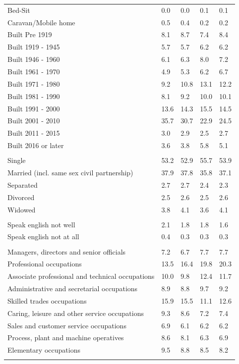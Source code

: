\documentclass{article}
\begin{document}
\begin{table}[h]
\begin{tabular}{KTTTT}
Bed-Sit & 0.0& 0.0& 0.1& 0.1\\
Caravan/Mobile home & 0.5& 0.4& 0.2& 0.2\\
    \hline
Built Pre 1919 & 8.1& 8.7& 7.4& 8.4\\
Built 1919 - 1945 & 5.7& 5.7& 6.2& 6.2\\
Built  1946 - 1960 & 6.1& 6.3& 8.0& 7.2\\
Built  1961 - 1970 & 4.9& 5.3& 6.2& 6.7\\
Built  1971 - 1980 &  9.2& 10.8& 13.1& 12.2\\
Built  1981 - 1990 &  8.1&  9.2& 10.0& 10.1\\
Built  1991 - 2000 & 13.6& 14.3& 15.5& 14.5\\
Built  2001 - 2010 & 35.7& 30.7& 22.9& 24.5\\
Built  2011 - 2015 & 3.0& 2.9& 2.5& 2.7\\
Built  2016 or later & 3.6& 3.8& 5.8& 5.1\\
\hline
    \\
    \hline
Single & 53.2& 52.9& 55.7& 53.9\\
Married (incl. same sex civil partnership) & 37.9& 37.8& 35.8& 37.1\\
Separated  & 2.7& 2.7& 2.4& 2.3\\
Divorced  & 2.5& 2.6& 2.5& 2.6\\
Widowed & 3.8& 4.1& 3.6& 4.1\\
\hline
    \\ 
    \hline
Speak english not well & 2.1& 1.8& 1.8& 1.6\\
Speak english not at all & 0.4& 0.3& 0.3& 0.3\\
\hline
    \\
    \hline
Managers, directors and senior officials & 7.2& 6.7& 7.7& 7.7\\
Professional occupations & 13.5& 16.4& 19.8& 20.3\\
Associate professional and technical occupations & 10.0&  9.8& 12.4& 11.7\\
Administrative and secretarial occupations & 8.9& 8.8& 9.7& 9.2\\
Skilled trades occupations & 15.9& 15.5& 11.1& 12.6\\
Caring, leisure and other service occupations & 9.3& 8.6& 7.2& 7.4\\
Sales and customer service occupations & 6.9& 6.1& 6.2& 6.2\\
Process, plant and machine operatives & 8.6& 8.1& 6.3& 6.9\\
Elementary occupations & 9.5& 8.8& 8.5& 8.2\\
\hline
\end{tabular}
\end{table}
\end{document}
